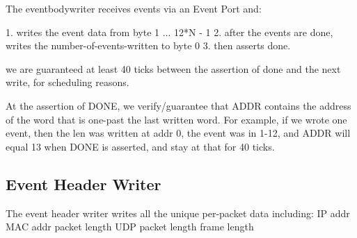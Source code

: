 The eventbodywriter receives events via an Event Port and: 

1. writes the event data from byte 1 ... 12*N - 1
2. after the events are done, writes the number-of-events-written to byte 0
3. then asserts done. 

we are guaranteed at least 40 ticks between the assertion of done and
the next write, for scheduling reasons.

At the assertion of DONE, we verify/guarantee that ADDR contains the address of the word that is one-past the last written word. For example, if we wrote one event, then the len was written at addr 0, the event was in 1-12, and ADDR will equal 13 when DONE is asserted, and stay at that for 40 ticks. 

\subsection{Event Header Writer}
The event header writer writes all the unique per-packet data including: 
IP addr
MAC addr
packet length
UDP packet length
frame length
